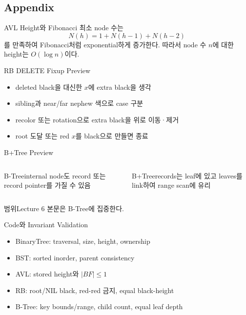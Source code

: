 \subsection{Appendix}
\begin{frame}{AVL Height와 Fibonacci}
최소 node 수는
\[
N(h)=1+N(h-1)+N(h-2)
\]
를 만족하여 Fibonacci처럼 exponential하게 증가한다. 따라서 node 수 $n$에 대한 height는 $O(\log n)$이다.
\end{frame}
\begin{frame}{RB DELETE Fixup Preview}
\begin{itemize}\item deleted black을 대신한 $x$에 extra black을 생각\item sibling과 near/far nephew 색으로 case 구분\item recolor 또는 rotation으로 extra black을 위로 이동·제거\item root 도달 또는 red $x$를 black으로 만들면 종료\end{itemize}
\end{frame}
\begin{frame}{B+Tree Preview}
\begin{columns}[T]\begin{block}{B-Tree}internal node도 record 또는 record pointer를 가질 수 있음\end{block}
\begin{block}{B+Tree}records는 leaf에 있고 leaves를 link하여 range scan에 유리\end{block}\end{columns}
\begin{alertblock}{범위}Lecture 6 본문은 B-Tree에 집중한다.\end{alertblock}
\end{frame}
\begin{frame}{Code와 Invariant Validation}
\begin{itemize}\item BinaryTree: traversal, size, height, ownership\item BST: sorted inorder, parent consistency\item AVL: stored height와 $|BF|\le1$\item RB: root/NIL black, red-red 금지, equal black-height\item B-Tree: key bounds/range, child count, equal leaf depth\end{itemize}
\end{frame}
